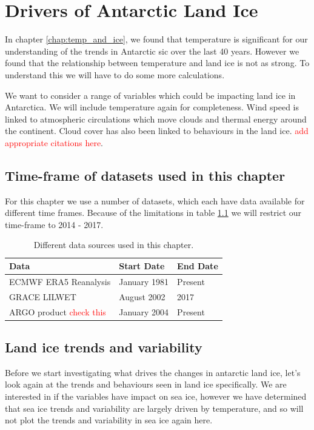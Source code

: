 \documentclass[../main.tex]{subfiles}
\begin{document}
\chapter{Drivers of Antarctic Land Ice}
\label{chap:land_ice}
In chapter \ref{chap:temp_and_ice}, we found that temperature is significant for our understanding of the trends in Antarctic \gls{sic} over the last 40 years. However we found that the relationship between temperature and land ice is not as strong. To understand this we will have to do some more calculations.

We want to consider a range of variables which could be impacting land ice in Antarctica. We will include temperature again for completeness. Wind speed is linked to atmospheric circulations which move clouds and thermal energy around the continent. Cloud cover has also been linked to behaviours in the land ice. \textcolor{red}{add appropriate citations here}. 

\section{Time-frame of datasets used in this chapter}
For this chapter we use a number of datasets, which each have data available for different time frames. Because of the limitations in table \ref{tab:landicedata} we will restrict our time-frame to 2014 - 2017.
\begin{table}[H]
\begin{tabular}{@{}lll@{}}
\toprule
Data                                     & Start Date   & End Date \\ \midrule
ECMWF ERA5 Reanalysis                    & January 1981 & Present  \\
GRACE \gls{LILWET}                       & August 2002  & 2017  \\
ARGO product \textcolor{red}{check this} & January 2004 & Present  \\ \bottomrule
\end{tabular}
\caption{Different data sources used in this chapter.}
\label{tab:landicedata}
\end{table}

\section{Land ice trends and variability}
Before we start investigating what drives the changes in antarctic land ice, let's look again at the trends and behaviours seen in land ice specifically. We are interested in if the variables have impact on sea ice, however we have determined that sea ice trends and variability are largely driven by temperature, and so will not plot the trends and variability in sea ice again here.
\end{document}

